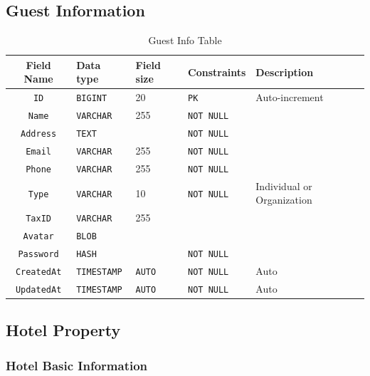 \subsection{Guest Information}

\begin{table}[H]
	\centering
	\begin{tabular}{cllll}
		\hline
		Field Name & Data type & Field size & Constraints & Description \\ \hline
		\texttt{ID} & \texttt{BIGINT} & 20 & \texttt{PK} & Auto-increment \\
		\texttt{Name} & \texttt{VARCHAR} & 255 & \texttt{NOT NULL} &  \\
		\texttt{Address} & \texttt{TEXT} & & \texttt{NOT NULL} &  \\
		\texttt{Email} & \texttt{VARCHAR} & 255 & \texttt{NOT NULL} &  \\
		\texttt{Phone} & \texttt{VARCHAR} & 255 & \texttt{NOT NULL} &  \\
		\texttt{Type} & \texttt{VARCHAR} & 10 & \texttt{NOT NULL} & Individual or Organization  \\
		\texttt{TaxID} & \texttt{VARCHAR} & 255 & &  \\
		\texttt{Avatar} & \texttt{BLOB} &  & &  \\
		\texttt{Password} & \texttt{HASH} &  & \texttt{NOT NULL} &  \\
		
		\texttt{CreatedAt} & \texttt{TIMESTAMP} & \texttt{AUTO} & \texttt{NOT NULL} & Auto \\
		\texttt{UpdatedAt} & \texttt{TIMESTAMP} & \texttt{AUTO} & \texttt{NOT NULL} & Auto \\
		\hline
	\end{tabular}
	\caption{Guest Info Table}
\end{table}

\subsection{Hotel Property}

\subsubsection{Hotel Basic Information}

